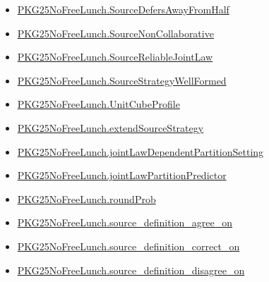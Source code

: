 \documentclass[10pt]{article}
\begin{document}
\begin{itemize}[leftmargin=1.2em]
\begin{itemize}[leftmargin=1.2em]
\item \hyperlink{paper-prerequisite-88409412b52edd25}{PKG25\allowbreak{}No\allowbreak{}Free\allowbreak{}Lunch.\allowbreak{}Source\allowbreak{}Defers\allowbreak{}Away\allowbreak{}From\allowbreak{}Half}
\item \hyperlink{paper-prerequisite-88a840f53df1cf52}{PKG25\allowbreak{}No\allowbreak{}Free\allowbreak{}Lunch.\allowbreak{}Source\allowbreak{}Non\allowbreak{}Collaborative}
\item \hyperlink{paper-prerequisite-bc76ca245dd2495f}{PKG25\allowbreak{}No\allowbreak{}Free\allowbreak{}Lunch.\allowbreak{}Source\allowbreak{}Reliable\allowbreak{}Joint\allowbreak{}Law}
\item \hyperlink{paper-prerequisite-cde5ac5fa1bdee72}{PKG25\allowbreak{}No\allowbreak{}Free\allowbreak{}Lunch.\allowbreak{}Source\allowbreak{}Strategy\allowbreak{}Well\allowbreak{}Formed}
\item \hyperlink{paper-prerequisite-bdded92620cfbb62}{PKG25\allowbreak{}No\allowbreak{}Free\allowbreak{}Lunch.\allowbreak{}Unit\allowbreak{}Cube\allowbreak{}Profile}
\item \hyperlink{paper-prerequisite-b970619f8c41551c}{PKG25\allowbreak{}No\allowbreak{}Free\allowbreak{}Lunch.\allowbreak{}extend\allowbreak{}Source\allowbreak{}Strategy}
\item \hyperlink{paper-prerequisite-e2c3eaace70952e5}{PKG25\allowbreak{}No\allowbreak{}Free\allowbreak{}Lunch.\allowbreak{}joint\allowbreak{}Law\allowbreak{}Dependent\allowbreak{}Partition\allowbreak{}Setting}
\item \hyperlink{paper-prerequisite-a7403850f72d70e1}{PKG25\allowbreak{}No\allowbreak{}Free\allowbreak{}Lunch.\allowbreak{}joint\allowbreak{}Law\allowbreak{}Partition\allowbreak{}Predictor}
\item \hyperlink{paper-prerequisite-728603a5bcbb8140}{PKG25\allowbreak{}No\allowbreak{}Free\allowbreak{}Lunch.\allowbreak{}round\allowbreak{}Prob}
\item \hyperlink{paper-prerequisite-4d6691bbd0af6579}{PKG25\allowbreak{}No\allowbreak{}Free\allowbreak{}Lunch.\allowbreak{}source\_\allowbreak{}definition\_\allowbreak{}agree\_\allowbreak{}on}
\item \hyperlink{paper-prerequisite-25b6f16dda3c73b9}{PKG25\allowbreak{}No\allowbreak{}Free\allowbreak{}Lunch.\allowbreak{}source\_\allowbreak{}definition\_\allowbreak{}correct\_\allowbreak{}on}
\item \hyperlink{paper-prerequisite-d753cda07d41e8d9}{PKG25\allowbreak{}No\allowbreak{}Free\allowbreak{}Lunch.\allowbreak{}source\_\allowbreak{}definition\_\allowbreak{}disagree\_\allowbreak{}on}

\end{itemize}
\end{itemize}
\end{document}
